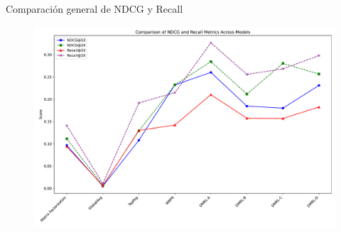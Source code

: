 \documentclass{beamer}
\begin{document}
\begin{frame}{Comparación general de NDCG y Recall}
    \begin{figure}
        \centering
        \includegraphics[width=\textwidth]{images/comparison.pdf}
    \end{figure}
\end{frame}
\end{document}
